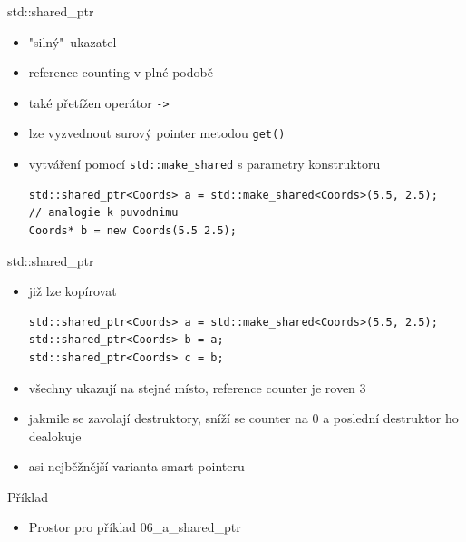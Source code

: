 \documentclass{beamer}
\begin{document}
\begin{xframe}{std::shared\_ptr}
	\begin{itemize}
		\item "silný"~ukazatel
		\item reference counting v plné podobě
		\item také přetížen operátor \texttt{->}
		\item lze vyzvednout surový pointer metodou \texttt{get()}
		\item vytváření pomocí \texttt{std::make\_shared} s parametry konstruktoru
\begin{lstlisting}[basicstyle=\fontsize{8}{9}\selectfont\ttfamily]
std::shared_ptr<Coords> a = std::make_shared<Coords>(5.5, 2.5);
// analogie k puvodnimu
Coords* b = new Coords(5.5 2.5);
\end{lstlisting}
	\end{itemize}
\end{xframe}

\begin{xframe}{std::shared\_ptr}
	\begin{itemize}
		\item již lze kopírovat
\begin{lstlisting}[basicstyle=\fontsize{8}{9}\selectfont\ttfamily]
std::shared_ptr<Coords> a = std::make_shared<Coords>(5.5, 2.5);
std::shared_ptr<Coords> b = a;
std::shared_ptr<Coords> c = b;
\end{lstlisting}
		\item všechny ukazují na stejné místo, reference counter je roven 3
		\item jakmile se zavolají destruktory, sníží se counter na 0 a poslední destruktor ho dealokuje
		\item asi nejběžnější varianta smart pointeru
	\end{itemize}
\end{xframe}

\begin{xframe}{Příklad}
	\begin{itemize}
		\item Prostor pro příklad 06\_a\_shared\_ptr
	\end{itemize}
\end{xframe}
\end{document}
